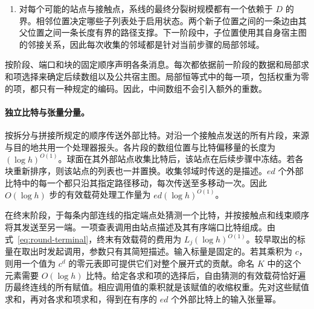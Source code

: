 \begin{enumerate}
将沃尔什系数逐一平方，再作逆变换，即可同时算出各自相关量 $\sum_i x_i x_{i+z}$。这需要对 $(\log h)^{O(1)}$ 比特的局部整数作 $O(N_b\log N_b)$ 次运算。按索引之差和前缀长度汇总这些系数。在根处，花费至多 $2^{(\log h)^{O(1)}}$ 次比特运算即可枚举维数 $\log_2 N_b=O((\log h)^2)$ 下的所有可逆矩阵。第一个极小者满足平均论证给出的界。各位置据此置换自己的块数组。由于相交叶区间的长度比有界，且每个叶中的单元数有界，便可根据相邻记录确定终端分配、转子设置及新标签。
\item 对每个可能的站点与接触点，系线的最终分裂树规模都有一个依赖于 $D$ 的界。相邻位置决定哪些子列表处于启用状态。两个新子位置之间的一条边由其父位置之间一条长度有界的路径支撑。下一阶段中，子位置使用其自身宿主图的邻接关系，因此每次收集的邻域都是针对当前步骤的局部邻域。
\end{enumerate}

按阶段、端口和块的固定顺序声明各条消息。每次都依据前一阶段的数据和局部求和项选择来确定后续数组以及公共宿主图。局部恒等式中的每一项，包括权重为零的项，都只有一种规定的编码。因此，中间数组不会引入额外的重数。

\paragraph{独立比特与张量分量。}
按拆分与拼接所规定的顺序传送外部比特。对沿一个接触点发送的所有片段，来源与目的地共用一个处理器报头。各片段的数组位置与比特偏移量的长度为 $(\log h)^{O(1)}$。球面在其外部站点收集比特后，该站点在后续步骤中冻结。若各块重新排序，则该站点的列表也一并置换。收集邻域时传送的是描述。$ed$ 个外部比特中的每一个都只沿其指定路径移动，每次传送至多移动一次。因此 $O(\log h)$ 步的有效载荷处理工作量为 $ed(\log h)^{O(1)}$。

在终末阶段，于每条内部连线的指定端点处猜测一个比特，并按接触点和线束顺序将其发送至另一端。一项查表调用由站点描述及其有序端口比特组成。由式~\eqref{eq:round-terminal}，终末有效载荷的费用为 $L_j(\log h)^{O(1)}$。较早取出的标量在取出时发起调用，参数只有其简短描述。输入标量是固定的。若其乘积为 $c$，则用一个值为 $c^d$ 的零元表即可提供它们对整个展开式的贡献。命名 $K$ 中的这个元素需要 $O(\log h)$ 比特。给定各求和项的选择后，自由猜测的有效载荷恰好遍历最终连线的所有赋值。相应调用值的乘积就是该赋值的收缩权重。先对这些赋值求和，再对各求和项求和，得到在有序的 $ed$ 个外部比特上的输入张量幂。

